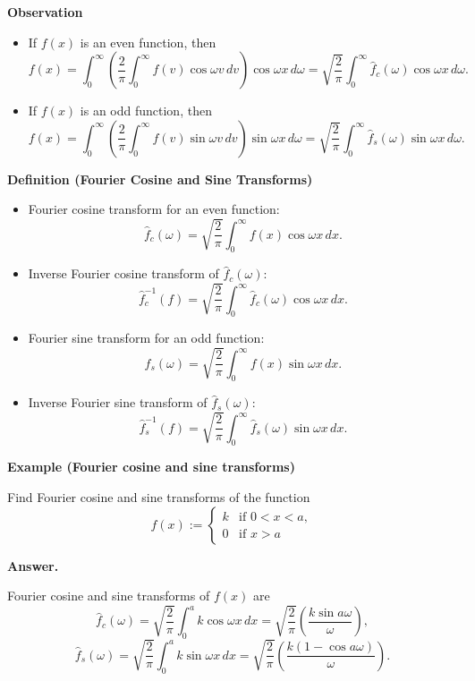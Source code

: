 \documentclass[12pt,openany]{book}
\theoremstyle{definition}
\begin{document}
	\textbf{Observation}
	
	\begin{itemize}
		\item If \( f(x) \) is an even function, then
		\[
		f(x) = \int_{0}^{\infty} \left( \frac{2}{\pi} \int_{0}^{\infty} f(v) \cos \omega v \, dv \right) \cos \omega x \, d\omega
		= \sqrt{\frac{2}{\pi}} \int_{0}^{\infty} \hat{f}_c(\omega) \cos \omega x \, d\omega.
		\]
		
		\item If \( f(x) \) is an odd function, then
		\[
		f(x) = \int_{0}^{\infty} \left( \frac{2}{\pi} \int_{0}^{\infty} f(v) \sin \omega v \, dv \right) \sin \omega x \, d\omega
		= \sqrt{\frac{2}{\pi}} \int_{0}^{\infty} \hat{f}_s(\omega) \sin \omega x \, d\omega.
		\]
	\end{itemize}
	
	\textbf{Definition (Fourier Cosine and Sine Transforms)}
	
	\begin{itemize}
		\item Fourier cosine transform for an even function:
		\[
		\hat{f}_c(\omega) = \sqrt{\frac{2}{\pi}} \int_{0}^{\infty} f(x) \cos \omega x \, dx.
		\]
		\item Inverse Fourier cosine transform of \( \hat{f}_c(\omega) \):
		\[
		\hat{f}_c^{-1}(f) = \sqrt{\frac{2}{\pi}} \int_{0}^{\infty} \hat{f}_c(\omega) \cos \omega x \, dx.
		\]
		\item Fourier sine transform for an odd function:
		\[
		\hat{f}_s(\omega) = \sqrt{\frac{2}{\pi}} \int_{0}^{\infty} f(x) \sin \omega x \, dx.
		\]
		\item Inverse Fourier sine transform of \( \hat{f}_s(\omega) \):
		\[
		\hat{f}_s^{-1}(f) = \sqrt{\frac{2}{\pi}} \int_{0}^{\infty} \hat{f}_s(\omega) \sin \omega x \, dx.
		\]
	\end{itemize}
	
	\textbf{Example (Fourier cosine and sine transforms)}
	
	Find Fourier cosine and sine transforms of the function
	\[
	f(x) :=
	\begin{cases}
		k & \text{if } 0 < x < a, \\
		0 & \text{if } x > a
	\end{cases}
	\]
	
	\textbf{Answer.}
	
	Fourier cosine and sine transforms of \( f(x) \) are
	\[
	\hat{f}_c(\omega) = \sqrt{\frac{2}{\pi}} \int_{0}^{a} k \cos \omega x \, dx = \sqrt{\frac{2}{\pi}} \left( \frac{k \sin a\omega}{\omega} \right),
	\]
	\[
	\hat{f}_s(\omega) = \sqrt{\frac{2}{\pi}} \int_{0}^{a} k \sin \omega x \, dx = \sqrt{\frac{2}{\pi}} \left( \frac{k(1 - \cos a\omega)}{\omega} \right).
	\]
	
\end{document}
